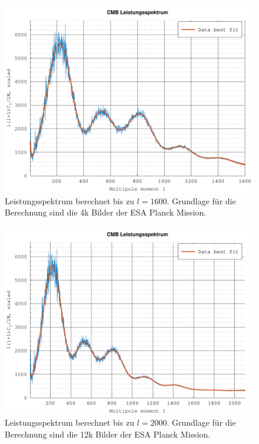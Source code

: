 \begin{figure}
	\centering
	\includegraphics[width=\linewidth]{cmb/data/4k1800-500.pdf}
	\caption{Leistungsspektrum berechnet bis zu $l = 1600$. Grundlage für die 
		Berechnung sind die 4k Bilder der ESA Planck Mission.}
	\label{fig:cmb-power-spec-1600}
\end{figure}

\begin{figure}
	\centering
	\includegraphics[width=\linewidth]{cmb/data/12k2500-500.pdf}
	\caption{Leistungsspektrum berechnet bis zu $l = 2000$. Grundlage für die 
	Berechnung sind die 12k Bilder der ESA Planck Mission.}
	\label{fig:cmb-power-spec-2000}
\end{figure}

